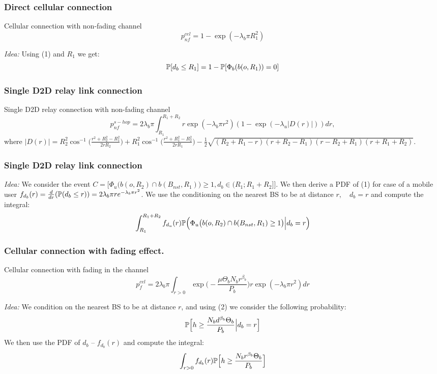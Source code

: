 \begin{frame}
  \frametitle {Direct cellular connection}
  \begin {block} {Cellular connection with non-fading channel}
    \[p_{nf}^{cel}=1-\exp(-\lambda_b\pi R_1^2)\]
  \end {block}
  \begin{minipage}{.65\textwidth}
    {\it Idea:} Using (1) and \(R_1\) we get:
    \[\P[d_b\le R_1]=1-\P[\Phi_b(b(o,R_1))=0]\]
  \end{minipage}
  \begin{minipage}{.3\textwidth}
    
  \end{minipage}
\end{frame}

\begin{frame}
  \frametitle{Single D2D relay link connection}
  \begin {block} {Single D2D relay connection with non-fading channel}
  \[p_{nf}^{s-hop}=2\lambda_b\pi\int_{R_1}^{R_1+R_2}r\exp(-\lambda_b\pi r^2)(1-\exp(-\lambda_u|D(r)|))dr,\]
  where $|D(r)|=R_2^2 \cos^{-1}\Big(\frac {r^2 + R_2^2 - R_1^2} {2rR_2}\Big)+R_1^2\cos^{-1}\Big(\frac {r^2 + R_1^2 - R_2^2} {2rR_1}\Big)-\frac {1} {2}\sqrt{(R_2+R_1-r)(r+R_2-R_1)(r-R_2+R_1)(r+R_1+R_2)}$.
  \end {block}
\end{frame}

\begin{frame}
  \frametitle{Single D2D relay link connection}
  \begin {minipage}{0.65\textwidth}
{\it Idea:} We consider the event \(C=\Big[\Phi_u\big(b(o,R_2)\cap b(B_{nst},R_1)\big)\ge1,d_b\in(R_1;R_1+R_2]\Big]\). 
We then derive a PDF of (1) for case of a mobile user \(f_{d_b}(r)=\frac{d}{dr}(\P(d_b\le r))=2\lambda_b\pi re^{-\lambda_b\pi r^2}\). 
We use the conditioning on the nearest BS to be at distance \(r,\quad d_b=r\) and compute the integral:
\[\int_{R_1}^{R_1+R_2}f_{d_u}(r)\P\Big(\Phi_u\big(b(o,R_2)\cap b(B_{nst},R_1)\ge1\big)\Big|d_b=r\Big)\]
  \end{minipage}
  \begin{minipage}{0.3\textwidth}
    
  \end{minipage}
\end {frame}

\begin {frame}
  \frametitle {Cellular connection with fading effect.}
  \begin {block} {Cellular connection with fading in the channel}
  \[p_{f}^{cel}=2\lambda_b\pi\int_{r>0}\exp\Big(-\frac {\mu \Theta_b N_b r^{\beta_b}} {P_b}\Big)r\exp(-\lambda_b\pi r^2)dr\]
  \end {block}
{\it Idea:} We condition on the nearest BS to be at distance \(r\), and using (2) we consider the following probability:
\[\P\Big[h\ge\frac{N_bd^{\beta_b}\Theta_b}{P_b}\Big|d_b=r\Big]\]
We then use the PDF of \(d_b\) -- \(f_{d_b}(r)\) and compute the integral:
\[\int_{r>0}f_{d_b}(r)\P\Big[h\ge\frac{N_br^{\beta_b}\Theta_b}{P_b}\Big]\]
\end {frame}
